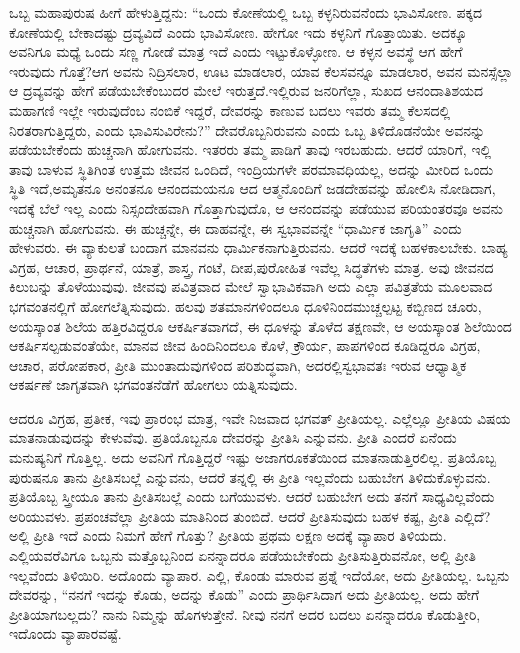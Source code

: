 ಒಬ್ಬ ಮಹಾಪುರುಷ ಹೀಗೆ ಹೇಳುತ್ತಿದ್ದನು: “ಒಂದು ಕೋಣೆಯಲ್ಲಿ ಒಬ್ಬ ಕಳ್ಳನಿರುವ\-ನೆಂದು ಭಾವಿಸೋಣ. ಪಕ್ಕದ ಕೋಣೆಯಲ್ಲಿ ಬೇಕಾದಷ್ಟು ದ್ರವ್ಯವಿದೆ ಎಂದು ಭಾವಿಸೋಣ. ಹೇಗೋ ಇದು ಕಳ್ಳನಿಗೆ ಗೊತ್ತಾಯಿತು. ಅದಕ್ಕೂ ಅವನಿಗೂ ಮಧ್ಯೆ ಒಂದು ಸಣ್ಣ ಗೋಡೆ ಮಾತ್ರ ಇದೆ ಎಂದು ಇಟ್ಟುಕೊಳ್ಳೋಣ. ಆ ಕಳ್ಳನ ಅವಸ್ಥೆ ಆಗ ಹೇಗೆ ಇರುವುದು ಗೊತ್ತೆ?\break ಆಗ ಅವನು ನಿದ್ರಿಸಲಾರ, ಊಟ ಮಾಡಲಾರ, ಯಾವ ಕೆಲಸವನ್ನೂ ಮಾಡಲಾರ, ಅವನ ಮನಸ್ಸೆಲ್ಲಾ ಆ ದ್ರವ್ಯವನ್ನು ಹೇಗೆ ಪಡೆಯಬೇಕೆಂಬುದರ ಮೇಲೆ ಇರುತ್ತದೆ.\break ಇಲ್ಲಿರುವ ಜನರಿಗೆಲ್ಲಾ, ಸುಖದ ಆನಂದಾತಿಶಯದ ಮಹಾಗಣಿ ಇಲ್ಲೇ ಇರುವುದೆಂಬ ನಂಬಿಕೆ ಇದ್ದರೆ, ದೇವರನ್ನು ಕಾಣುವ ಬದಲು ಇವರು ತಮ್ಮ ಕೆಲಸದಲ್ಲಿ ನಿರತರಾಗುತ್ತಿದ್ದರು, ಎಂದು ಭಾವಿಸುವಿರೇನು?” ದೇವರೊಬ್ಬನಿರುವನು ಎಂದು ಒಬ್ಬ ತಿಳಿದೊಡನೆಯೇ ಅವನನ್ನು ಪಡೆಯಬೇಕೆಂದು ಹುಚ್ಚನಾಗಿ ಹೋಗುವನು. ಇತರರು ತಮ್ಮ ಪಾಡಿಗೆ ತಾವು ಇರಬಹುದು. ಆದರೆ ಯಾರಿಗೆ, ಇಲ್ಲಿ ತಾವು ಬಾಳುವ ಸ್ಥಿತಿಗಿಂತ ಉತ್ತಮ ಜೀವನ ಒಂದಿದೆ, ಇಂದ್ರಿಯಗಳೇ ಪರಮಾವಧಿಯಲ್ಲ, ಅದನ್ನು ಮೀರಿದ ಒಂದು ಸ್ಥಿತಿ ಇದೆ,\break ಅಮೃತನೂ ಅನಂತನೂ ಆನಂದಮಯನೂ ಆದ ಆತ್ಮನೊಂದಿಗೆ ಜಡದೇಹವನ್ನು ಹೋಲಿಸಿ ನೋಡಿದಾಗ, ಇದಕ್ಕೆ ಬೆಲೆ ಇಲ್ಲ ಎಂದು ನಿಸ್ಸಂದೇಹವಾಗಿ ಗೊತ್ತಾಗುವುದೊ, ಆ ಆನಂದವನ್ನು ಪಡೆಯುವ ಪರಿಯಂತರವೂ ಅವನು ಹುಚ್ಚನಾಗಿ ಹೋಗುವನು. ಈ ಹುಚ್ಚನ್ನೇ, ಈ ದಾಹವನ್ನೇ, ಈ ಸ್ವಭಾವವನ್ನೇ “ಧಾರ್ಮಿಕ ಜಾಗೃತಿ” ಎಂದು ಹೇಳುವರು. ಈ ವ್ಯಾಕುಲತೆ ಬಂದಾಗ ಮಾನವನು ಧಾರ್ಮಿಕನಾಗುತ್ತಿರುವನು. ಆದರೆ ಇದಕ್ಕೆ ಬಹಳ\break ಕಾಲಬೇಕು. ಬಾಹ್ಯ ವಿಗ್ರಹ, ಆಚಾರ, ಪ್ರಾರ್ಥನೆ, ಯಾತ್ರೆ, ಶಾಸ್ತ್ರ, ಗಂಟೆ, ದೀಪ,\break ಪುರೋಹಿತ ಇವೆಲ್ಲ ಸಿದ್ಧತೆಗಳು ಮಾತ್ರ. ಅವು ಜೀವನದ ಕಿಲುಬನ್ನು ತೊಳೆಯುವುವು. ಜೀವವು ಪವಿತ್ರವಾದ ಮೇಲೆ ಸ್ವಾಭಾವಿಕವಾಗಿ ಅದು ಎಲ್ಲಾ ಪವಿತ್ರತೆಯ ಮೂಲವಾದ ಭಗವಂತನಲ್ಲಿಗೆ ಹೋಗಲೆತ್ನಿಸುವುದು. ಹಲವು ಶತಮಾನಗಳಿಂದಲೂ ಧೂಳಿನಿಂದ\break ಮುಚ್ಚಲ್ಪಟ್ಟ ಕಬ್ಬಿಣದ ಚೂರು, ಅಯಸ್ಕಾಂತ ಶಿಲೆಯ ಹತ್ತಿರವಿದ್ದರೂ ಆಕರ್ಷಿತವಾಗದೆ, ಈ ಧೂಳನ್ನು ತೊಳೆದ ತಕ್ಷಣವೇ, ಆ ಅಯಸ್ಕಾಂತ ಶಿಲೆಯಿಂದ ಆಕರ್ಷಿಸಲ್ಪಡುವಂತೆಯೇ, ಮಾನವ ಜೀವ ಹಿಂದಿನಿಂದಲೂ ಕೊಳೆ, ಕ್ರೌರ್ಯ, ಪಾಪಗಳಿಂದ ಕೂಡಿದ್ದರೂ ವಿಗ್ರಹ, ಆಚಾರ, ಪರೋಪಕಾರ, ಪ್ರೀತಿ ಮುಂತಾದುವುಗಳಿಂದ ಪರಿಶುದ್ಧವಾಗಿ, ಅದರಲ್ಲಿ\break ಸ್ವಭಾವತಃ ಇರುವ ಆಧ್ಯಾತ್ಮಿಕ ಆಕರ್ಷಣೆ ಜಾಗೃತವಾಗಿ ಭಗವಂತನೆಡೆಗೆ ಹೋಗಲು ಯತ್ನಿಸುವುದು.

ಆದರೂ ವಿಗ್ರಹ, ಪ್ರತೀಕ, ಇವು ಪ್ರಾರಂಭ ಮಾತ್ರ, ಇವೇ ನಿಜವಾದ ಭಗವತ್​ ಪ್ರೀತಿಯಲ್ಲ. ಎಲ್ಲೆಲ್ಲೂ ಪ್ರೀತಿಯ ವಿಷಯ ಮಾತನಾಡುವುದನ್ನು ಕೇಳುವೆವು. ಪ್ರತಿಯೊಬ್ಬನೂ ದೇವರನ್ನು ಪ್ರೀತಿಸಿ ಎನ್ನುವನು. ಪ್ರೀತಿ ಎಂದರೆ ಏನೆಂದು ಮನುಷ್ಯನಿಗೆ ಗೊತ್ತಿಲ್ಲ. ಅದು ಅವನಿಗೆ ಗೊತ್ತಿದ್ದರೆ ಇಷ್ಟು ಅಜಾಗರೂಕತೆಯಿಂದ ಮಾತನಾಡುತ್ತಿರಲಿಲ್ಲ. ಪ್ರತಿಯೊಬ್ಬ ಪುರುಷನೂ ತಾನು ಪ್ರೀತಿಸಬಲ್ಲೆ ಎನ್ನುವನು, ಆದರೆ ತನ್ನಲ್ಲಿ ಈ ಪ್ರೀತಿ ಇಲ್ಲವೆಂದು ಬಹುಬೇಗ ತಿಳಿದುಕೊಳ್ಳುವನು. ಪ್ರತಿಯೊಬ್ಬ ಸ್ತ್ರೀಯೂ ತಾನು ಪ್ರೀತಿಸಬಲ್ಲೆ ಎಂದು ಬಗೆಯುವಳು. ಆದರೆ ಬಹುಬೇಗ ಅದು ತನಗೆ ಸಾಧ್ಯವಿಲ್ಲವೆಂದು ಅರಿಯುವಳು. ಪ್ರಪಂಚವೆಲ್ಲಾ ಪ್ರೀತಿಯ ಮಾತಿನಿಂದ ತುಂಬಿದೆ. ಆದರೆ ಪ್ರೀತಿಸುವುದು ಬಹಳ ಕಷ್ಟ, ಪ್ರೀತಿ ಎಲ್ಲಿದೆ? ಅಲ್ಲಿ ಪ್ರೀತಿ ಇದೆ ಎಂದು ನಿಮಗೆ ಹೇಗೆ ಗೊತ್ತು? ಪ್ರೀತಿಯ ಪ್ರಥಮ ಲಕ್ಷಣ ಅದಕ್ಕೆ ವ್ಯಾಪಾರ ತಿಳಿಯದು. ಎಲ್ಲಿಯವರೆವಿಗೂ ಒಬ್ಬನು ಮತ್ತೊಬ್ಬನಿಂದ ಏನನ್ನಾದರೂ ಪಡೆಯಬೇಕೆಂದು ಪ್ರೀತಿಸುತ್ತಿರುವನೋ, ಅಲ್ಲಿ ಪ್ರೀತಿ ಇಲ್ಲವೆಂದು ತಿಳಿಯಿರಿ. ಅದೊಂದು ವ್ಯಾಪಾರ. ಎಲ್ಲಿ, ಕೊಂಡು ಮಾರುವ ಪ್ರಶ್ನೆ ಇದೆಯೋ, ಅದು ಪ್ರೀತಿಯಲ್ಲ. ಒಬ್ಬನು ದೇವರನ್ನು, “ನನಗೆ ಇದನ್ನು ಕೊಡು, ಅದನ್ನು ಕೊಡು” ಎಂದು ಪ್ರಾರ್ಥಿಸಿದಾಗ ಅದು ಪ್ರೀತಿಯಲ್ಲ. ಅದು ಹೇಗೆ ಪ್ರೀತಿಯಾಗಬಲ್ಲದು? ನಾನು ನಿಮ್ಮನ್ನು ಹೊಗಳುತ್ತೇನೆ. ನೀವು ನನಗೆ ಅದರ ಬದಲು ಏನನ್ನಾದರೂ ಕೊಡುತ್ತೀರಿ, ಇದೊಂದು ವ್ಯಾಪಾರವಷ್ಟೆ.

